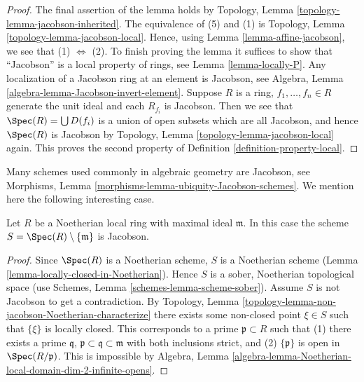 \begin{proof}
The final assertion of the lemma holds by
Topology, Lemma \ref{topology-lemma-jacobson-inherited}.
The equivalence of (5) and (1) is
Topology, Lemma \ref{topology-lemma-jacobson-local}.
Hence, using Lemma \ref{lemma-affine-jacobson},
we see that (1) $\Leftrightarrow$ (2).
To finish proving the lemma it suffices to show that ``Jacobson''
is a local property of rings, see Lemma \ref{lemma-locally-P}.
Any localization of a Jacobson ring at an element is Jacobson, see
Algebra, Lemma \ref{algebra-lemma-Jacobson-invert-element}.
Suppose $R$ is a ring, $f_1, \ldots, f_n \in R$ generate the unit
ideal and each $R_{f_i}$ is Jacobson. Then we see that
$\Spec(R) = \bigcup D(f_i)$ is a union of open subsets
which are all Jacobson, and hence $\Spec(R)$ is Jacobson
by Topology, Lemma \ref{topology-lemma-jacobson-local} again.
This proves the second property of Definition \ref{definition-property-local}.
\end{proof}

\noindent
Many schemes used commonly in algebraic geometry are Jacobson, see
Morphisms, Lemma \ref{morphisms-lemma-ubiquity-Jacobson-schemes}.
We mention here the following interesting case.

\begin{lemma}
\label{lemma-complement-closed-point-Jacobson}
Let $R$ be a Noetherian local ring with maximal ideal $\mathfrak m$.
In this case the scheme $S = \Spec(R) \setminus \{\mathfrak m\}$
is Jacobson.
\end{lemma}

\begin{proof}
Since $\Spec(R)$ is a Noetherian scheme,
$S$ is a Noetherian scheme (Lemma \ref{lemma-locally-closed-in-Noetherian}).
Hence $S$ is a sober, Noetherian topological space (use
Schemes, Lemma \ref{schemes-lemma-scheme-sober}).
Assume $S$ is not Jacobson to
get a contradiction. By
Topology, Lemma \ref{topology-lemma-non-jacobson-Noetherian-characterize}
there exists some non-closed point $\xi \in S$
such that $\{\xi\}$ is locally closed. This corresponds
to a prime $\mathfrak p \subset R$ such that (1) there exists
a prime $\mathfrak q$, $\mathfrak p \subset \mathfrak q \subset \mathfrak m$
with both inclusions strict, and (2) $\{\mathfrak p\}$ is open in
$\Spec(R/\mathfrak p)$. This is impossible by Algebra,
Lemma \ref{algebra-lemma-Noetherian-local-domain-dim-2-infinite-opens}.
\end{proof}







